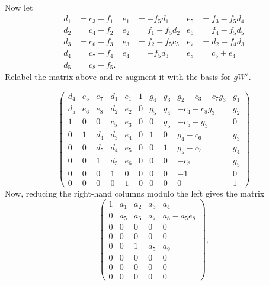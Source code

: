 Now let
\begin{align*}
  d_1 &= c_3 - f_1 & e_1 &=     - f_5d_1 & e_5 &= f_3 - f_5d_4 \\
  d_2 &= c_4 - f_2 & e_2 &= f_1 - f_5d_2 & e_6 &= f_4 - f_5d_5 \\
  d_3 &= c_6 - f_3 & e_3 &= f_2 - f_5c_5 & e_7 &= d_2 - f_4d_3 \\
  d_4 &= c_7 - f_4 & e_4 &=     - f_5d_3 & e_8 &= c_5 + e_4 \\
  d_5 &= c_8 - f_5.
\end{align*}
Relabel the matrix above and re-augment it with the basis for $gW^7$.
\begin{comment}
\[ \left( \begin{array}{lllll}
  d_4 & e_5 & e_7 & d_1 & e_1 \\
  d_5 & e_6 & e_8 & d_2 & e_2 \\
    1 &   0 &   0 & c_5 & e_3 \\
    0 &   1 & d_4 & d_3 & e_4 \\
    0 &   0 & d_5 & d_4 & e_5 \\
    0 &   0 &   1 & d_5 & e_6 \\
    0 &   0 &   0 &   1 &   0 \\
    0 &   0 &   0 &   0 &   1
\end{array} \right) \]
\end{comment}
\[ \left( \begin{array}{rrrrr|rrrrr}
  d_4 & e_5 & e_7 & d_1 & e_1 &   1 & g_4 & g_3 & g_2 - c_3 - c_7g_3 & g_1 \\
  d_5 & e_6 & e_8 & d_2 & e_2 &   0 & g_5 & g_4 &     - c_4 - c_8g_3 & g_2 \\
    1 &   0 &   0 & c_5 & e_3 &   0 &   0 & g_5 &     - c_5    - g_3 &   0 \\
    0 &   1 & d_4 & d_3 & e_4 &   0 &   1 &   0 & g_4 - c_6          & g_3 \\ 
    0 &   0 & d_5 & d_4 & e_5 &   0 &   0 &   1 & g_5 - c_7          & g_4 \\ 
    0 &   0 &   1 & d_5 & e_6 &   0 &   0 &   0 &     - c_8          & g_5 \\
    0 &   0 &   0 &   1 &   0 &   0 &   0 &   0 &       - 1          &   0 \\
    0 &   0 &   0 &   0 &   1 &   0 &   0 &   0 &         0          &   1
\end{array} \right) \]
Now, reducing the right-hand columns modulo the left gives the matrix
\[ \begin{pmatrix}
  1 & a_1 & a_2 & a_3 & a_4 \\
  0 & a_5 & a_6 & a_7 & a_8 - a_5e_8 \\
  0 &   0 &   0 &   0 &   0 \\
  0 &   0 &   0 &   0 &   0 \\ 
  0 &   0 &   1 & a_5 & a_9 \\ 
  0 &   0 &   0 &   0 &   0 \\
  0 &   0 &   0 &   0 &   0 \\
  0 &   0 &   0 &   0 &   0
\end{pmatrix}, \]
